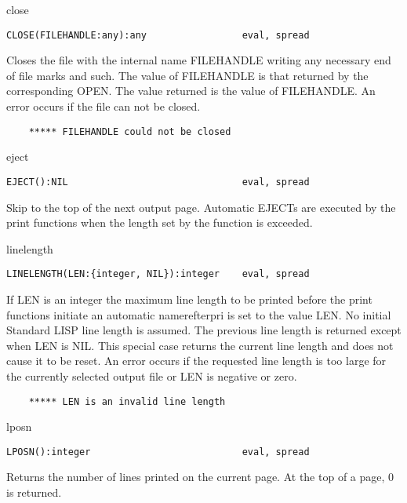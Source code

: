 \begin{Function}{close}
\begin{verbatim}
CLOSE(FILEHANDLE:any):any                 eval, spread
\end{verbatim}
   Closes  the  file with  the  internal name  FILEHANDLE writing
   any  necessary  end of  file marks  and such.    The  value of
   FILEHANDLE  is that  returned by  the corresponding  OPEN. The
   value  returned is the value of FILEHANDLE. An error occurs if
   the file can not be closed.
\begin{verbatim}
    ***** FILEHANDLE could not be closed
\end{verbatim}

\end{Function}
\begin{Function}{eject}
\begin{verbatim}
EJECT():NIL                               eval, spread
\end{verbatim}
   Skip  to the top  of the next  output page.   Automatic EJECTs
   are  executed by  the print functions  when the  length set by
   the  function is exceeded.

\end{Function}
\begin{Function}{linelength}
\begin{verbatim}
LINELENGTH(LEN:{integer, NIL}):integer    eval, spread
\end{verbatim}
   If  LEN is  an integer the  maximum line length  to be printed
   before  the print  functions initiate  an automatic nameref{terpri} is
   set  to the value LEN. No initial Standard LISP line length is
   assumed.    The previous line  length is  returned except when
   LEN  is NIL. This special case returns the current line length
   and  does not cause  it to be reset.   An  error occurs if the
   requested  line length is too large for the currently selected
   output file or LEN is negative or zero.
\begin{verbatim}
    ***** LEN is an invalid line length
\end{verbatim}


\end{Function}
\begin{Function}{lposn}
\begin{verbatim}
LPOSN():integer                           eval, spread
\end{verbatim}
   Returns  the number of lines printed on  the current page.  At
   the top of a page, 0 is returned.

\end{Function}

